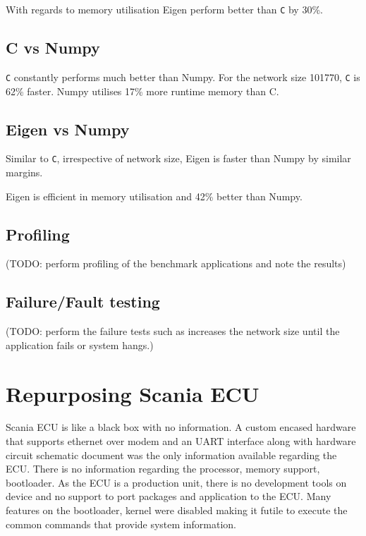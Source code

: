 With regards to memory utilisation Eigen perform better than \verb!C! by 30\%.

\subsection{C vs Numpy}
\verb!C! constantly performs much better than Numpy. For the network size 101770, \verb!C! is 62\% faster.
Numpy utilises 17\% more runtime memory than C.

\subsection{Eigen vs Numpy}
Similar to \verb!C!, irrespective of network size, Eigen is faster than Numpy by similar margins.

Eigen is efficient in memory utilisation and 42\% better than Numpy.

\subsection{Profiling}
(TODO: perform profiling of the benchmark applications and note the results)

\subsection{Failure/Fault testing}
(TODO: perform the failure tests such as increases the network size until the application fails or system hangs.)

\section{Repurposing Scania ECU}
Scania ECU is like a black box with no information. A custom encased hardware that supports ethernet over modem and an UART interface along with hardware circuit schematic document was the only information available regarding the ECU. There is no information regarding the processor,  memory support, bootloader. As the ECU is a production unit, there is no development tools on device and no support to port packages and application to the ECU. Many features on the bootloader, kernel were disabled making it futile to execute the common commands that provide system information.

